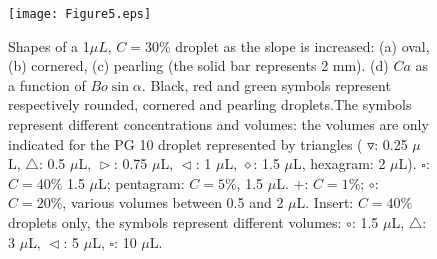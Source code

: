 \documentclass[aps,prl,reprint,superscriptaddress,amsmath,amssymb,]{revtex4-1}
\begin{document}

\begin{figure}
\texttt{[image: Figure5.eps]}
\caption{Shapes of a 1$\mu L$, $C=30\%$ droplet as the slope is increased: (a) oval, (b) cornered, (c) pearling (the solid bar represents 2 mm). (d) $Ca$ as a function of $Bo\sin \alpha$. Black, red and green symbols represent respectively rounded, cornered and pearling droplets.The symbols represent different concentrations and volumes: the volumes are only indicated for the PG 10 droplet represented by triangles ( $\triangledown$: 0.25 $\mu$L, $\triangle$: 0.5 $\mu$L, $\vartriangleright$: 0.75 $\mu$L, $\vartriangleleft$: 1 $\mu$L, $\diamond$: 1.5 $\mu$L, hexagram: 2 $\mu$L). $\square$: $C=40\%$ 1.5 $\mu$L; pentagram: $C=5\%$, 1.5 $\mu$L. $+$: $C=1\%$; $\circ$: $C=20\%$, various volumes between 0.5 and 2 $\mu$L. Insert: $C=40\%$ droplets only, the symbols represent different volumes: $\circ$: 1.5 $\mu$L,  $\triangle$: 3 $\mu$L, $\vartriangleleft$: 5 $\mu$L, $\square$: 10 $\mu$L.}
\label{fig:deformation}
\end{figure}
\end{document}
